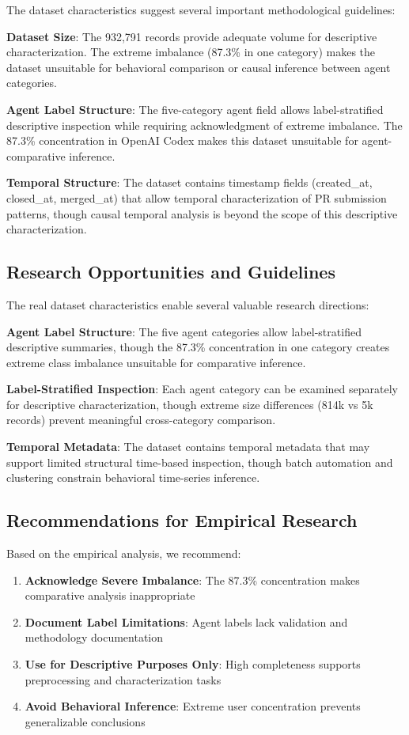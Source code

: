 \documentclass[conference]{IEEEtran}
\begin{document}
The dataset characteristics suggest several important methodological guidelines:

\textbf{Dataset Size}: The 932,791 records provide adequate volume for descriptive characterization. The extreme imbalance (87.3\% in one category) makes the dataset unsuitable for behavioral comparison or causal inference between agent categories.

\textbf{Agent Label Structure}: The five-category agent field allows label-stratified descriptive inspection while requiring acknowledgment of extreme imbalance. The 87.3\% concentration in OpenAI Codex makes this dataset unsuitable for agent-comparative inference.

\textbf{Temporal Structure}: The dataset contains timestamp fields (created_at, closed_at, merged_at) that allow temporal characterization of PR submission patterns, though causal temporal analysis is beyond the scope of this descriptive characterization.

\subsection{Research Opportunities and Guidelines}

The real dataset characteristics enable several valuable research directions:

\textbf{Agent Label Structure}: The five agent categories allow label-stratified descriptive summaries, though the 87.3\% concentration in one category creates extreme class imbalance unsuitable for comparative inference.

\textbf{Label-Stratified Inspection}: Each agent category can be examined separately for descriptive characterization, though extreme size differences (814k vs 5k records) prevent meaningful cross-category comparison.

\textbf{Temporal Metadata}: The dataset contains temporal metadata that may support limited structural time-based inspection, though batch automation and clustering constrain behavioral time-series inference.

\subsection{Recommendations for Empirical Research}

Based on the empirical analysis, we recommend:

\begin{enumerate}
    \item \textbf{Acknowledge Severe Imbalance}: The 87.3\% concentration makes comparative analysis inappropriate
    \item \textbf{Document Label Limitations}: Agent labels lack validation and methodology documentation  
    \item \textbf{Use for Descriptive Purposes Only}: High completeness supports preprocessing and characterization tasks
    \item \textbf{Avoid Behavioral Inference}: Extreme user concentration prevents generalizable conclusions
\end{enumerate}
\end{document}
